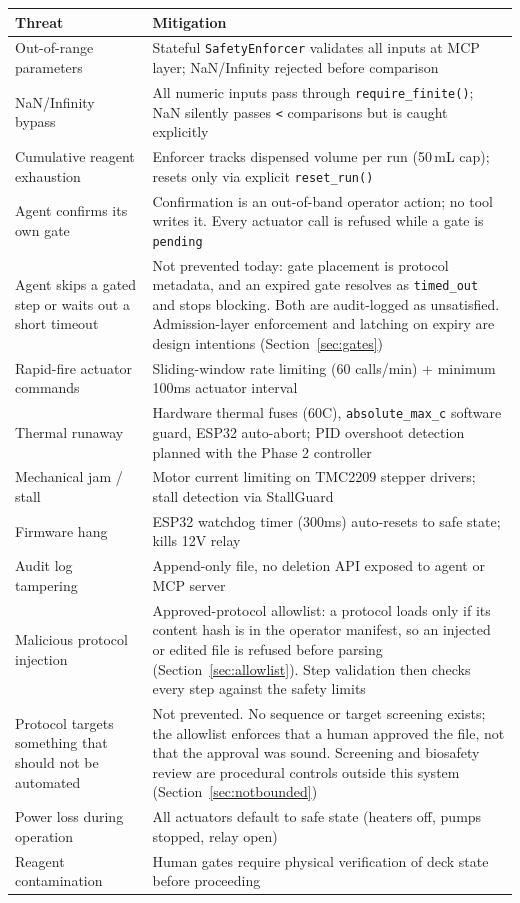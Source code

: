 \documentclass[11pt,letterpaper]{article}
\begin{document}
\begin{xltabular}{\textwidth}{L{4.4cm} Y}
\toprule
\textbf{Threat} & \textbf{Mitigation} \\
\midrule
\endhead
Out-of-range parameters & Stateful \texttt{SafetyEnforcer} validates all inputs at MCP layer; NaN/Infinity rejected before comparison \\
NaN/Infinity bypass & All numeric inputs pass through \texttt{require\_finite()}; NaN silently passes \texttt{<} comparisons but is caught explicitly \\
Cumulative reagent exhaustion & Enforcer tracks dispensed volume per run (50\,mL cap); resets only via explicit \texttt{reset\_run()} \\
Agent confirms its own gate & Confirmation is an out-of-band operator action; no tool writes it. Every actuator call is refused while a gate is \texttt{pending} \\
Agent skips a gated step or waits out a short timeout & Not prevented today: gate placement is protocol metadata, and an expired gate resolves as \texttt{timed\_out} and stops blocking. Both are audit-logged as unsatisfied. Admission-layer enforcement and latching on expiry are design intentions (Section~\ref{sec:gates}) \\
Rapid-fire actuator commands & Sliding-window rate limiting (60 calls/min) + minimum 100ms actuator interval \\
Thermal runaway & Hardware thermal fuses (60\textdegree{}C), \texttt{absolute\_max\_c} software guard, ESP32 auto-abort; PID overshoot detection planned with the Phase 2 controller \\
Mechanical jam / stall & Motor current limiting on TMC2209 stepper drivers; stall detection via StallGuard \\
Firmware hang & ESP32 watchdog timer (300ms) auto-resets to safe state; kills 12V relay \\
Audit log tampering & Append-only file, no deletion API exposed to agent or MCP server \\
Malicious protocol injection & Approved-protocol allowlist: a protocol loads only if its content hash is in the operator manifest, so an injected or edited file is refused before parsing (Section~\ref{sec:allowlist}). Step validation then checks every step against the safety limits \\
Protocol targets something that should not be automated & Not prevented. No sequence or target screening exists; the allowlist enforces that a human approved the file, not that the approval was sound. Screening and biosafety review are procedural controls outside this system (Section~\ref{sec:notbounded}) \\
Power loss during operation & All actuators default to safe state (heaters off, pumps stopped, relay open) \\
Reagent contamination & Human gates require physical verification of deck state before proceeding \\*
\bottomrule
\end{xltabular}
\end{document}
